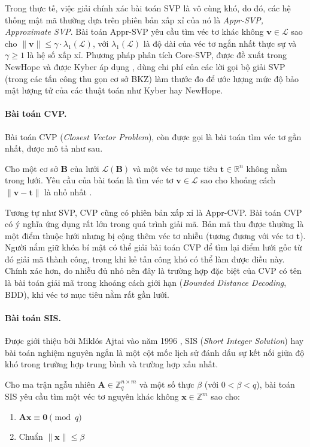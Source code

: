 \documentclass[../LuanVan.tex]{subfiles}
\begin{document}
Trong thực tế, việc giải chính xác bài toán SVP là vô cùng khó, do đó, các hệ thống mật mã thường dựa trên phiên bản xấp xỉ của nó là \textit{Appr-SVP, Approximate SVP}. Bài toán Appr-SVP yêu cầu tìm véc tơ khác không $\mathbf{v}\in\mathcal{L}$ sao cho $\|\mathbf{v}\| \le \gamma \cdot \lambda_1(\mathcal{L})$, với $\lambda_1(\mathcal{L})$ là độ dài của véc tơ ngắn nhất thực sự và $\gamma \ge 1$ là hệ số xấp xỉ.
Phương pháp phân tích Core-SVP, được đề xuất trong NewHope \cite{Alkim16} và được Kyber áp dụng \cite{Bos18}, dùng chi phí của các lời gọi bộ giải SVP (trong các tấn công thu gọn cơ sở BKZ) làm thước đo để ước lượng mức độ bảo mật lượng tử của các thuật toán như Kyber hay NewHope.

\paragraph{Bài toán CVP.} Bài toán CVP (\textit{Closest Vector Problem}), còn được gọi là bài toán tìm véc tơ gần nhất, được mô tả như sau.
\begin{bt}
    Cho một cơ sở $\mathbf{B}$ của lưới $\mathcal{L}(\mathbf{B})$ và một véc tơ mục tiêu $\mathbf{t} \in \mathbb{R}^n$ không nằm trong lưới. Yêu cầu của bài toán là tìm véc tơ $\mathbf{v} \in \mathcal{L}$ sao cho khoảng cách $\|\mathbf{v}-\mathbf{t}\|$ là nhỏ nhất \cite{Bergami16}.
\end{bt}

Tương tự như SVP, CVP cũng có phiên bản xấp xỉ là Appr-CVP. Bài toán CVP có ý nghĩa ứng dụng rất lớn trong quá trình giải mã. Bản mã thu được thường là một điểm thuộc lưới nhưng bị cộng thêm véc tơ nhiễu (tương đương với véc tơ $\mathbf{t}$). Người nắm giữ khóa bí mật có thể giải bài toán CVP để tìm lại điểm lưới gốc từ đó giải mã thành công, trong khi kẻ tấn công khó có thể làm được điều này.
Chính xác hơn, do nhiễu đủ nhỏ nên đây là trường hợp đặc biệt của CVP có tên là bài toán giải mã trong khoảng cách giới hạn (\textit{Bounded Distance Decoding}, BDD), khi véc tơ mục tiêu nằm rất gần lưới.

\paragraph{Bài toán SIS.} Được giới thiệu bởi Miklós Ajtai vào năm 1996 \cite{Ajtai96}, SIS (\textit{Short Integer Solution}) hay bài toán nghiệm nguyên ngắn là một cột mốc lịch sử đánh dấu sự kết nối giữa độ khó trong trường hợp trung bình và trường hợp xấu nhất.
\begin{bt}
    Cho ma trận ngẫu nhiên $\mathbf{A} \in \mathbb{Z}_q^{n \times m}$ và một số thực $\beta$ (với $0<\beta<q$), bài toán SIS yêu cầu tìm một véc tơ nguyên khác không $\mathbf{x} \in \mathbb{Z}^m$ sao cho:
    \begin{enumerate}
        \item $\mathbf{A}\mathbf{x} \equiv \mathbf{0} \pmod q$
        \item Chuẩn $\|\mathbf{x}\| \le \beta$
    \end{enumerate}
\end{bt}
\end{document}
